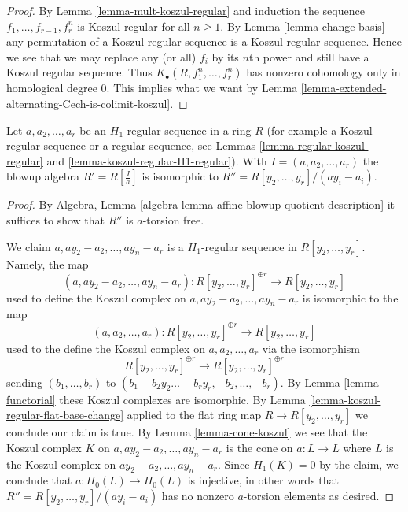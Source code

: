 \begin{proof}
By Lemma \ref{lemma-mult-koszul-regular} and induction the sequence
$f_1, \ldots, f_{r - 1}, f_r^n$ is Koszul regular for all $n \geq 1$.
By Lemma \ref{lemma-change-basis} any permutation of a Koszul regular
sequence is a Koszul regular sequence. Hence we see that we may replace
any (or all) $f_i$ by its $n$th power and still have a Koszul regular
sequence. Thus $K_\bullet(R, f_1^n, \ldots, f_r^n)$ has nonzero
cohomology only in homological degree $0$. This implies what we want by
Lemma \ref{lemma-extended-alternating-Cech-is-colimit-koszul}.
\end{proof}

\begin{lemma}
\label{lemma-blowup-regular-sequence}
Let $a, a_2, \ldots, a_r$ be an $H_1$-regular sequence in a ring $R$
(for example a Koszul regular sequence or a regular sequence, see
Lemmas \ref{lemma-regular-koszul-regular} and
\ref{lemma-koszul-regular-H1-regular}).
With $I = (a, a_2, \ldots, a_r)$ the blowup algebra $R' = R[\frac{I}{a}]$
is isomorphic to $R'' = R[y_2, \ldots, y_r]/(a y_i - a_i)$.
\end{lemma}

\begin{proof}
By Algebra, Lemma \ref{algebra-lemma-affine-blowup-quotient-description}
it suffices to show that $R''$ is $a$-torsion free.

\medskip\noindent
We claim $a, ay_2 - a_2, \ldots, ay_n - a_r$ is a $H_1$-regular
sequence in $R[y_2, \ldots, y_r]$. Namely, the map
$$
(a, ay_2 - a_2, \ldots, ay_n - a_r) :
R[y_2, \ldots, y_r]^{\oplus r}
\longrightarrow
R[y_2, \ldots, y_r]
$$
used to define the Koszul complex on $a, ay_2 - a_2, \ldots, ay_n - a_r$
is isomorphic to the map
$$
(a, a_2, \ldots, a_r) :
R[y_2, \ldots, y_r]^{\oplus r} \longrightarrow
R[y_2, \ldots, y_r]
$$
used to the define the Koszul complex on $a, a_2, \ldots, a_r$
via the isomorphism
$$
R[y_2, \ldots, y_r]^{\oplus r}
\longrightarrow
R[y_2, \ldots, y_r]^{\oplus r}
$$
sending $(b_1, \ldots, b_r)$ to
$(b_1 - b_2y_2 \ldots - b_ry_r, -b_2, \ldots, - b_r)$.
By Lemma \ref{lemma-functorial} these Koszul complexes are isomorphic.
By Lemma \ref{lemma-koszul-regular-flat-base-change}
applied to the flat ring map $R \to R[y_2, \ldots, y_r]$
we conclude our claim is true. By Lemma \ref{lemma-cone-koszul}
we see that the Koszul complex $K$ on $a, ay_2 - a_2, \ldots, ay_n - a_r$
is the cone on $a : L \to L$ where $L$ is the Koszul complex
on $ay_2 - a_2, \ldots, ay_n - a_r$. Since $H_1(K) = 0$ by the claim,
we conclude that $a : H_0(L) \to H_0(L)$ is injective, in other words that
$R'' = R[y_2, \ldots, y_r]/(a y_i - a_i)$
has no nonzero $a$-torsion elements as desired.
\end{proof}

